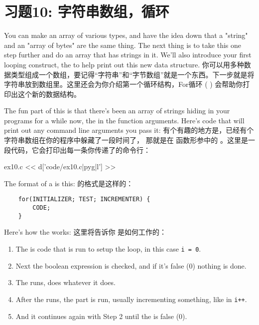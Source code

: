 \chapter{习题10: 字符串数组，循环}

You can make an array of various types, and have the idea down that a
"string" and an "array of bytes" are the same thing.  The next thing is
to take this one step further and do an array that has strings in it.
We'll also introduce your first looping construct, the 
to help print out this new data structure.
你可以用多种数据类型组成一个数组，要记得“字符串”和“字节数组”就是一个东西。下一步就是将字符串放到数组里。这里还会为你介绍第一个循环结构，For循环 (  ) 会帮助你打印出这个新的数据结构。

The fun part of this is that there's been an array of strings hiding in
your programs for a while now, the  in the 
function arguments.  Here's code that will print out any command line
arguments you pass it:
有个有趣的地方是，已经有个字符串数组在你的程序中躲藏了一段时间了， 那就是在  函数形参中的  。这里是一段代码，它会打印出每一条你传递了的命令行：

\begin{code}{ex10.c}
<< d['code/ex10.c|pyg|l'] >>
\end{code}

The format of a  is this:
 的格式是这样的：

\begin{Verbatim}
    for(INITIALIZER; TEST; INCREMENTER) {
        CODE;
    }
\end{Verbatim}

Here's how the  works:
这里将告诉你  是如何工作的：

\begin{enumerate}
\item The  is code that is run to setup the loop, in this
    case \verb|i = 0|. 
\item Next the  boolean expression is checked, and if it's false (0)
    nothing is done.
\item The  runs, does whatever it does.
\item After the  runs, the  part is run, usually
    incrementing something, like in \verb|i++|.
\item And it continues again with Step 2 until the  is false (0).
\end{enumerate}

